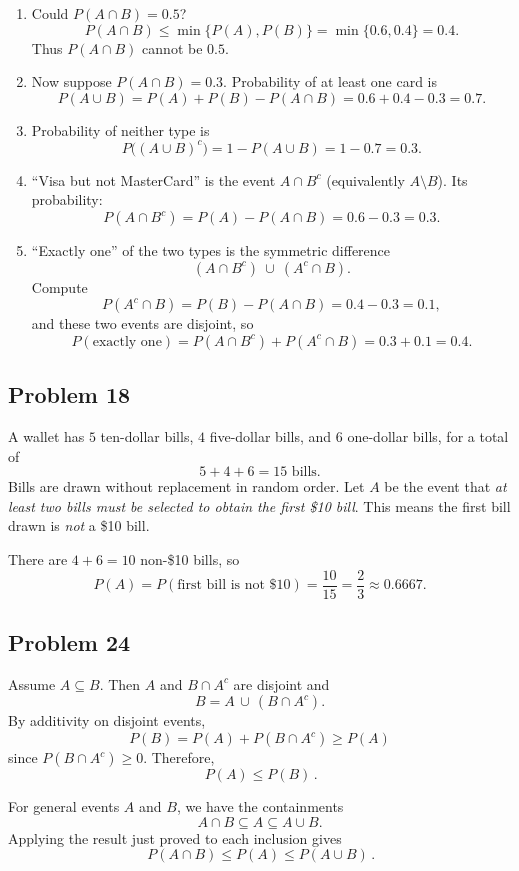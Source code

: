 \documentclass{article}
\begin{document}
\begin{enumerate}
\item[(a)] Could $P(A\cap B)=0.5$?
\[
P(A\cap B)\le \min\{P(A),P(B)\}=\min\{0.6,0.4\}=0.4.
\]
Thus $P(A\cap B)$ cannot be $0.5$.

\item[(b)] Now suppose $P(A\cap B)=0.3$. Probability of at least one card is
\[
P(A\cup B)=P(A)+P(B)-P(A\cap B)=0.6+0.4-0.3=0.7.
\]

\item[(c)] Probability of neither type is
\[
P\big((A\cup B)^c\big)=1-P(A\cup B)=1-0.7=0.3.
\]

\item[(d)] ``Visa but not MasterCard'' is the event $A\cap B^c$ (equivalently $A\setminus B$). Its
    probability:
\[
P(A\cap B^c)=P(A)-P(A\cap B)=0.6-0.3=0.3.
\]

\item[(e)] ``Exactly one'' of the two types is the symmetric difference
\[
(A\cap B^c)\ \cup\ (A^c\cap B).
\]
Compute
\[
P(A^c\cap B)=P(B)-P(A\cap B)=0.4-0.3=0.1,
\]
and these two events are disjoint, so
\[
P(\text{exactly one})=P(A\cap B^c)+P(A^c\cap B)=0.3+0.1=0.4.
\]
\end{enumerate}

\subsection*{Problem 18}

A wallet has $5$ ten-dollar bills, $4$ five-dollar bills, and $6$ one-dollar bills, for a total of
\[
5+4+6=15 \text{ bills.}
\]
Bills are drawn without replacement in random order. Let $A$ be the event that \emph{at least two bills must
be selected to obtain the first \$10 bill}. This means the first bill drawn is \emph{not} a \$10 bill.

There are $4+6=10$ non-\$10 bills, so
\[
P(A)=P(\text{first bill is not \$10})=\frac{10}{15}=\frac{2}{3}\approx 0.6667.
\]


\subsection*{Problem 24}

Assume $A\subseteq B$. Then $A$ and $B\cap A^{c}$ are disjoint and
\[
B = A \,\cup\, (B\cap A^{c}).
\]
By additivity on disjoint events,
\[
P(B)=P(A)+P(B\cap A^{c}) \ge P(A)
\]
since $P(B\cap A^{c})\ge 0$. Therefore,
\[
\boxed{\,P(A)\le P(B)\,}.
\]

For general events $A$ and $B$, we have the containments
\[
A\cap B \subseteq A \subseteq A\cup B.
\]
Applying the result just proved to each inclusion gives
\[
\boxed{\,P(A\cap B)\le P(A)\le P(A\cup B)\,}.
\]
\end{document}
